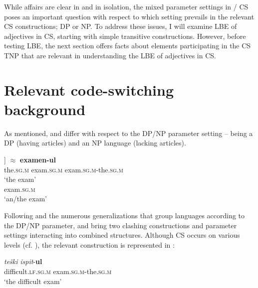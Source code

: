 \documentclass[output=paper,hidelinks,newtxmath,]{langscibook}
\begin{document}
	\z
\z


\noindent While affairs are clear in  and  in isolation, the mixed parameter settings in / CS poses an important question with respect to which setting prevails in the relevant CS constructions; DP or NP. To address these issues, I will examine LBE of adjectives in CS, starting with simple transitive constructions. However, before testing LBE, the next section offers facts about elements participating in the CS TNP that are relevant in understanding the LBE of adjectives in CS.

\section{Relevant code-switching background}\label{15:s4}

As mentioned,  and  differ with respect to the DP/NP parameter setting --  being a DP (having articles) and  an NP language (lacking articles).

\ea \label{15:ex9}
	\ea\label{15:ex9a}
    \gll [\textsubscript{DP} \textbf{{}-ul} [\textsubscript{NP} \textbf{examen}]]\hspace{0.6cm} $\approx$\hspace{0.7cm} \textbf{examen-ul}\\          
         {} the\textsc{.sg.m} {} exam\textsc{.sg.m} {} exam\textsc{.sg.m}-the.\textsc{sg.m}\\
         \glt `the exam'
	\ex\label{15:ex9b}
    \\
         {} exam\textsc{.sg.m}\\ 
         \glt `an/the exam'
         
	\z
\z

\noindent Following \citet{Boskovic2008,Boskovic2012} and the numerous generalizations that group languages according to the DP/NP parameter,  and  bring two clashing constructions and parameter settings interacting into combined structures. Although CS occurs on various levels (cf. \citealt{Petroj}), the relevant construction is represented in :

\ea \label{15:ex10}
\gll  \textit{teški} \textit{ispit}{}-\textbf{ul}\\
     difficult.\textsc{lf.sg.m} exam\textsc{.sg.m}-the\textsc{.sg.m}\\
     \glt `the difficult exam'
\z
\end{document}

